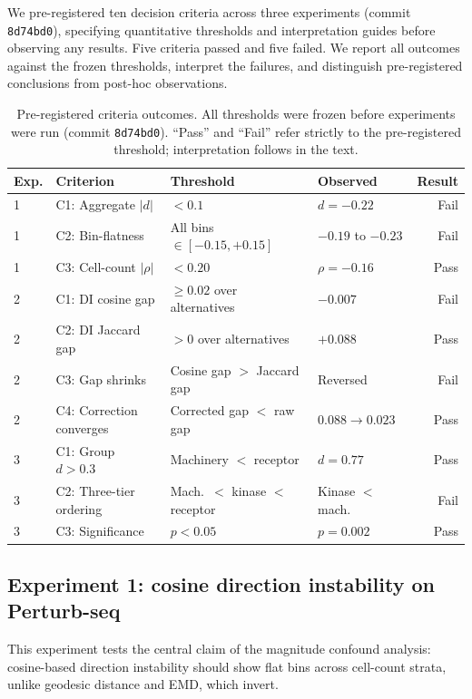 \documentclass[11pt]{article}
\begin{document}
We pre-registered ten decision criteria across three experiments (commit
\texttt{8d74bd0}), specifying quantitative thresholds and interpretation
guides before observing any results. Five criteria passed and five
failed. We report all outcomes against the frozen thresholds, interpret
the failures, and distinguish pre-registered conclusions from post-hoc
observations.

\begin{table}[htbp]
\centering
\caption{Pre-registered criteria outcomes. All thresholds were frozen
before experiments were run (commit \texttt{8d74bd0}). ``Pass'' and
``Fail'' refer strictly to the pre-registered threshold; interpretation
follows in the text.}
\label{tab:prereg_outcomes}
\small
\begin{tabular}{llllr}
\toprule
\textbf{Exp.} & \textbf{Criterion} & \textbf{Threshold} & \textbf{Observed} & \textbf{Result} \\
\midrule
1 & C1: Aggregate $|d|$ & $< 0.1$ & $d = -0.22$ & Fail \\
1 & C2: Bin-flatness & All bins $\in [-0.15, +0.15]$ & $-0.19$ to $-0.23$ & Fail \\
1 & C3: Cell-count $|\rho|$ & $< 0.20$ & $\rho = -0.16$ & Pass \\
\midrule
2 & C1: DI cosine gap & $\geq 0.02$ over alternatives & $-0.007$ & Fail \\
2 & C2: DI Jaccard gap & $> 0$ over alternatives & $+0.088$ & Pass \\
2 & C3: Gap shrinks & Cosine gap $>$ Jaccard gap & Reversed & Fail \\
2 & C4: Correction converges & Corrected gap $<$ raw gap & $0.088 \to 0.023$ & Pass \\
\midrule
3 & C1: Group $d > 0.3$ & Machinery $<$ receptor & $d = 0.77$ & Pass \\
3 & C2: Three-tier ordering & Mach.\ $<$ kinase $<$ receptor & Kinase $<$ mach. & Fail \\
3 & C3: Significance & $p < 0.05$ & $p = 0.002$ & Pass \\
\bottomrule
\end{tabular}
\end{table}

\subsection{Experiment 1: cosine direction instability on Perturb-seq}

This experiment tests the central claim of the magnitude confound
analysis: cosine-based direction instability should show flat bins across
cell-count strata, unlike geodesic distance and EMD, which invert.
\end{document}
